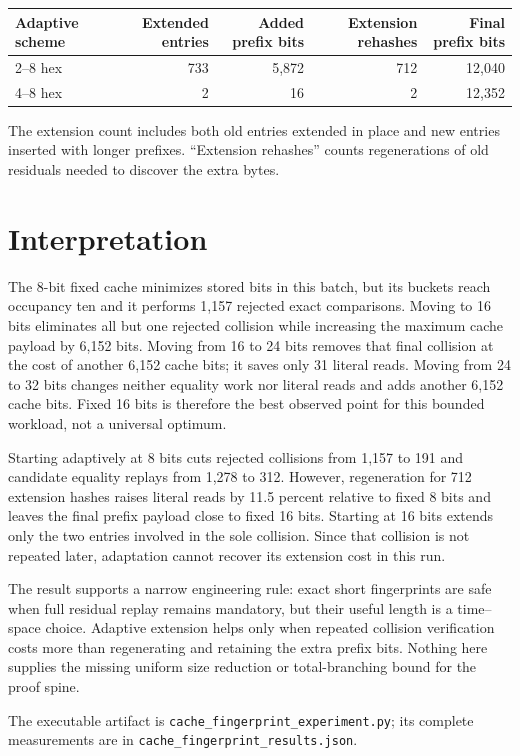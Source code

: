 \documentclass[11pt]{article}
\begin{document}
\begin{center}
\begin{tabular}{lrrrr}
\toprule
Adaptive scheme & Extended entries & Added prefix bits & Extension rehashes & Final prefix bits\\
\midrule
2--8 hex & 733 & 5,872 & 712 & 12,040\\
4--8 hex & 2 & 16 & 2 & 12,352\\
\bottomrule
\end{tabular}
\end{center}
The extension count includes both old entries extended in place and new entries
inserted with longer prefixes.  ``Extension rehashes'' counts regenerations of
old residuals needed to discover the extra bytes.

\section{Interpretation}
The 8-bit fixed cache minimizes stored bits in this batch, but its buckets reach
occupancy ten and it performs 1,157 rejected exact comparisons.  Moving to 16
bits eliminates all but one rejected collision while increasing the maximum
cache payload by 6,152 bits.  Moving from 16 to 24 bits removes that final
collision at the cost of another 6,152 cache bits; it saves only 31 literal
reads.  Moving from 24 to 32 bits changes neither equality work nor literal
reads and adds another 6,152 cache bits.  Fixed 16 bits is therefore the best
observed point for this bounded workload, not a universal optimum.

Starting adaptively at 8 bits cuts rejected collisions from 1,157 to 191 and
candidate equality replays from 1,278 to 312.  However, regeneration for 712
extension hashes raises literal reads by 11.5 percent relative to fixed 8 bits
and leaves the final prefix payload close to fixed 16 bits.  Starting at 16
bits extends only the two entries involved in the sole collision.  Since that
collision is not repeated later, adaptation cannot recover its extension cost
in this run.

The result supports a narrow engineering rule: exact short fingerprints are
safe when full residual replay remains mandatory, but their useful length is a
time--space choice.  Adaptive extension helps only when repeated collision
verification costs more than regenerating and retaining the extra prefix bits.
Nothing here supplies the missing uniform size reduction or total-branching
bound for the proof spine.

The executable artifact is \texttt{cache\_fingerprint\_experiment.py}; its
complete measurements are in \texttt{cache\_fingerprint\_results.json}.

\end{document}
